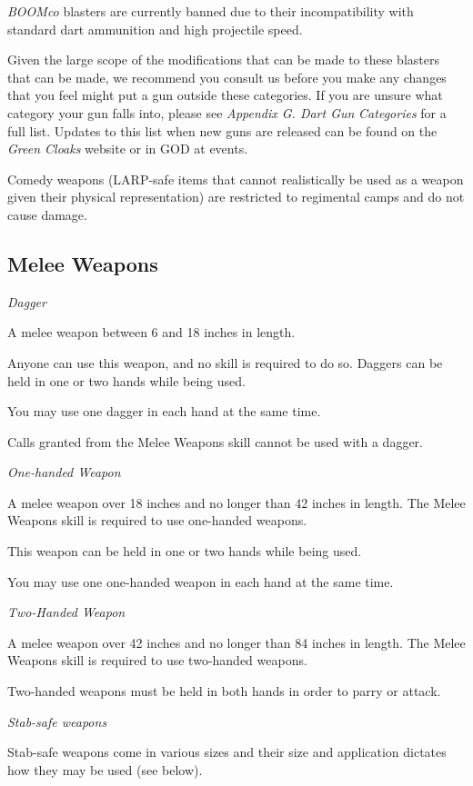 \textit{BOOMco} blasters are currently banned due to their incompatibility with standard dart ammunition and high projectile speed.

Given the large scope of the modifications that can be made to these blasters that can be made, we recommend you consult us before you make any changes that you feel might put a gun outside these categories. If you are unsure what category your gun falls into, please see \textit{Appendix G. Dart Gun} \textit{Categories} for a full list. Updates to this list when new guns are released can be found on the \textit{Green Cloaks} website or in GOD at events.

Comedy weapons (LARP-safe items that cannot realistically be used as a weapon given their physical representation) are restricted to regimental camps and do not cause damage.

\subsection{Melee Weapons}

\textit{Dagger}

A melee weapon between 6 and 18 inches in length.

Anyone can use this weapon, and no skill is required to do so. Daggers can be held in one or two hands while being used.

You may use one dagger in each hand at the same time.

Calls granted from the Melee Weapons skill cannot be used with a dagger.

\textit{One-handed Weapon}

A melee weapon over 18 inches and no longer than 42 inches in length. The Melee Weapons skill is required to use one-handed weapons.

This weapon can be held in one or two hands while being used.

You may use one one-handed weapon in each hand at the same time.

\textit{Two-Handed Weapon}

A melee weapon over 42 inches and no longer than 84 inches in length. The Melee Weapons skill is required to use two-handed weapons.

Two-handed weapons must be held in both hands in order to parry or attack.

\textit{Stab-safe weapons}

Stab-safe weapons come in various sizes and their size and application dictates how they may be used (see below).

